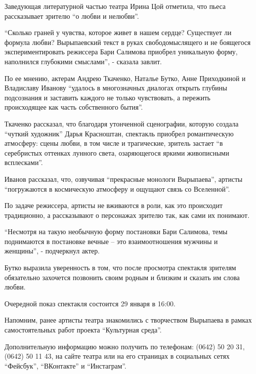 
Заведующая литературной частью театра Ирина Цой отметила, что пьеса
рассказывает зрителю \enquote{о любви и нелюбви}.

\enquote{Сколько граней у чувства, которое живет в нашем сердце? Существует ли формула
любви? Вырыпаевский текст в руках свободомыслящего и не боящегося
экспериментировать режиссера Бари Салимова приобрел уникальную форму,
наполнился глубокими смыслами}, - сказала завлит.


По ее мнению, актерам Андрею Ткаченко, Наталье Бутко, Анне Приходкиной и
Владиславу Иванову \enquote{удалось в многозначных диалогах открыть глубины подсознания
и заставить каждого не только чувствовать, а пережить происходящее как часть
собственного бытия}.

Ткаченко рассказал, что благодаря утонченной сценографии, которую создала
\enquote{чуткий художник} Дарья Красноштан, спектакль приобрел романтическую атмосферу:
сцены любви, в том числе и трагические, зритель застает \enquote{в серебристых оттенках
лунного света, озаряющегося яркими живописными всплесками}.

Иванов рассказал, что, озвучивая \enquote{прекрасные монологи Вырыпаева}, артисты
\enquote{погружаются в космическую атмосферу и ощущают связь со Вселенной}.

По задаче режиссера, артисты не вживаются в роли, как это происходит
традиционно, а рассказывают о персонажах зрителю так, как сами их понимают.

\enquote{Несмотря на такую необычную форму постановки Бари Салимова, темы поднимаются в
постановке вечные – это взаимоотношения мужчины и женщины}, - подчеркнул актер.

Бутко выразила уверенность в том, что после просмотра спектакля зрителям
обязательно захочется позвонить своим родным и близким и сказать им слова
любви.

Очередной показ спектакля состоится 29 января в 16:00.

Напомним, ранее артисты театра знакомились с творчеством Вырыпаева в рамках
самостоятельных работ проекта \enquote{Культурная среда}. 

Дополнительную информацию можно получить по телефонам: (0642) 50 20 31, (0642)
50 11 43, на сайте театра или на его страницах в социальных сетях \enquote{Фейсбук},
\enquote{ВКонтакте} и \enquote{Инстаграм}.
